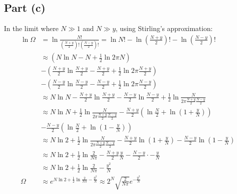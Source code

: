 \documentclass{article}
\begin{document}
\subsection*{Part (c)}
In the limit where $N \gg 1$ and $N \gg y$, using Stirling's approximation:
\begin{equation}
    \begin{split}
        \ln \Omega & = \ln \frac{N!}{\left(\frac{N + y}{2}\right)!\left(\frac{N - y}{2}\right)!} = \ln N! - \ln\left(\frac{N + y}{2}\right)! - \ln\left(\frac{N - y}{2}\right)! \\
        & \approx \left(N\ln N - N + \frac{1}{2}\ln 2\pi N\right) \\
        & - \left(\frac{N + y}{2}\ln \frac{N + y}{2} - \frac{N + y}{2} + \frac{1}{2}\ln 2\pi \frac{N + y}{2}\right) \\
        & - \left(\frac{N - y}{2}\ln \frac{N - y}{2} - \frac{N - y}{2} + \frac{1}{2}\ln 2\pi \frac{N - y}{2}\right) \\
        & \approx N\ln N - \frac{N + y}{2}\ln \frac{N + y}{2} - \frac{N - y}{2}\ln \frac{N - y}{2} + \frac{1}{2}\ln\frac{N}{2\pi\frac{N + y}{2}\frac{N - y}{2}} \\
        & \approx N\ln N+ \frac{1}{2}\ln\frac{N}{2\pi\frac{N + y}{2}\frac{N - y}{2}} - \frac{N + y}{2}\left(\ln\frac{N}{2} + \ln \left(1 + \frac{y}{N}\right)\right) \\ & - \frac{N - y}{2}\left(\ln\frac{N}{2} + \ln \left(1 - \frac{y}{N}\right)\right) \\
        & \approx N\ln 2+ \frac{1}{2}\ln\frac{N}{2\pi\frac{N + y}{2}\frac{N - y}{2}}  - \frac{N + y}{2}\ln \left(1 + \frac{y}{N}\right) - \frac{N - y}{2}\ln \left(1 - \frac{y}{N}\right) \\
        & \approx N\ln 2+ \frac{1}{2}\ln\frac{2}{N\pi}  - \frac{N + y}{2}\frac{y}{N} - \frac{N - y}{2} \cdot -\frac{y}{N} \\
        & \approx N\ln 2+ \frac{1}{2}\ln\frac{2}{N\pi} - \frac{y^2}{N} \\
        \Omega & \approx e^{N\ln 2+ \frac{1}{2}\ln\frac{2}{N\pi} - \frac{y^2}{N}} \approx 2^N\sqrt{\frac{2}{N\pi}}e^{- \frac{y^2}{N}}
    \end{split}
\end{equation}
\end{document}
